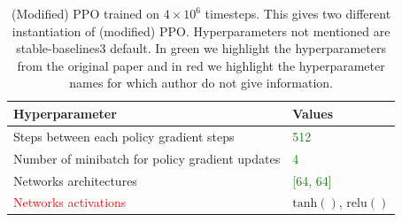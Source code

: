 \begin{table}
    \centering
    \caption{(Modified) PPO trained on $4\times10^6$ timesteps. This gives two different instantiation of (modified) PPO. Hyperparameters not mentioned are stable-baselines3 default. In green we highlight the hyperparameters from the original paper and in red we highlight the hyperparameter names for which author do not give information.}\label{tab:ibmdp-rl2}
    \begin{tabular}{ll}
    \toprule
    \textbf{Hyperparameter} & \textbf{Values}\\
    \midrule
    Steps between each policy gradient steps & \textcolor{green}{512} \\
    Number of minibatch for policy gradient updates & \textcolor{green}{4} \\
    Networks architectures & \textcolor{green}{[64, 64]}\\
    \textcolor{red}{Networks activations} & $\operatorname{tanh()}$, $\operatorname{relu()}$\\
    \bottomrule
    \end{tabular}
    \end{table}

